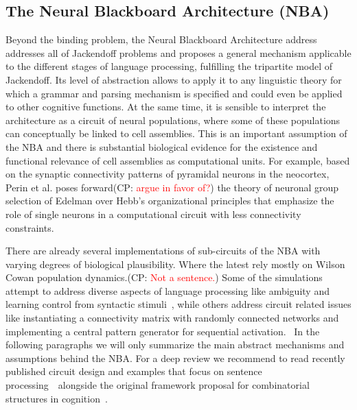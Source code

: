 \documentclass[10pt]{article}
\newcommand{\noteCP}[1]{(CP: \textcolor{red}{#1})}
\begin{document}
\subsection{The Neural Blackboard Architecture (NBA)}

{\label{935508}}

Beyond the binding problem, the Neural Blackboard Architecture address
addresses all of Jackendoff problems\cite{Jackendoff_2002b} and
proposes a general mechanism applicable to the different stages of
language processing, fulfilling the tripartite model of
Jackendoff\cite{Jackendoff_2002a}. Its level of abstraction allows to
apply it to any linguistic theory for which a grammar and parsing
mechanism is specified and could even be applied to other cognitive
functions. At the same time, it is sensible to interpret the
architecture as a circuit of neural populations, where some of these
populations can conceptually be linked to cell assemblies. This is an
important assumption of the NBA and there is substantial biological
evidence for the existence and functional relevance of cell assemblies
as computational units\cite{Huyck_2013}. For example, based on the
synaptic connectivity patterns of pyramidal neurons in the neocortex,
Perin et al.\cite{Perin_2011} poses forward\noteCP{argue in favor of?}
the theory of neuronal group selection of
Edelman\cite{edelman1987neural} over Hebb's organizational
principles\cite{hebb2005organization} that emphasize the role of
single neurons in a computational circuit with less connectivity
constraints.

There are already several implementations of sub-circuits of the NBA
with varying degrees of biological plausibility. Where the latest rely
mostly on Wilson Cowan population dynamics\cite{Destexhe_2009}.\noteCP{Not a sentence.} Some
of the simulations attempt to address diverse aspects of language
processing like ambiguity\cite{Frank_2014} and learning control from
syntactic stimuli~\cite{van_der_Velde_2010}, while others address
circuit related issues like instantiating a connectivity matrix with
randomly connected networks\cite{van_der_Velde_2011} and implementing
a central pattern generator for sequential
activation\cite{van_Dijk_2015}. ~In the following paragraphs we will
only summarize the main abstract mechanisms and assumptions behind the
NBA. For a deep review we recommend to read recently published circuit
design and examples that focus on sentence
processing~\cite{de2015combinatorial}~alongside the original framework
proposal for combinatorial structures in
cognition~\cite{van_der_Velde_2006}.
\end{document}
